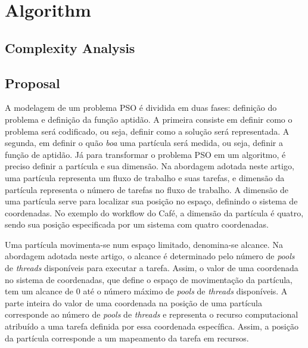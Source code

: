\section{Algorithm}
\label{sec:algoritmo}

\subsection{Complexity Analysis}
\label{subsec:complexity}

\subsection{Proposal}
\label{subsec:proposal}
A modelagem de um problema PSO é dividida em duas fases: definição do problema e definição da função aptidão. A primeira consiste em definir como o problema será codificado, ou seja, definir como a solução será representada. A segunda, em definir o quão \textit{boa} uma partícula será medida, ou seja, definir a função de aptidão.
Já para transformar o problema PSO em um algoritmo, é preciso definir a partícula e sua dimensão. Na abordagem adotada neste artigo, uma partícula representa um fluxo de trabalho e suas tarefas, e dimensão da partícula representa o número de tarefas no fluxo de trabalho. A dimensão de uma partícula serve para localizar sua posição no espaço, definindo o sistema de coordenadas. No exemplo do workflow do Café, a dimensão da partícula é quatro, sendo sua posição especificada por um sistema com quatro coordenadas.

Uma partícula movimenta-se num espaço limitado, denomina-se alcance. Na abordagem adotada neste artigo, o alcance é determinado pelo número de \emph{pools} de \emph{threads} disponíveis para executar a tarefa. Assim, o valor de uma coordenada no sistema de coordenadas, que define o espaço de movimentação da partícula, tem um alcance de 0 até o número máximo de \emph{pools} de \emph{threads} disponíveis. A parte inteira do valor de uma coordenada na posição de uma partícula corresponde ao número de \emph{pools} de \emph{threads} e representa o recurso computacional atribuído a uma tarefa definida por essa coordenada específica. Assim, a posição da partícula corresponde a um mapeamento da tarefa em recursos. 


